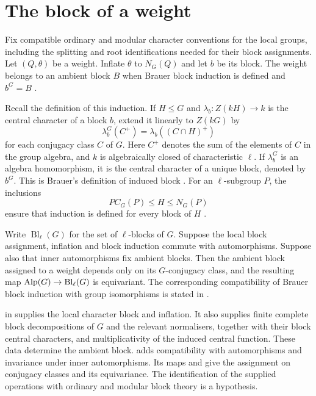 \section{The block of a weight}

Fix compatible ordinary and modular character conventions for the
local groups, including the splitting and root identifications needed
for their block assignments.
Let $(Q,\theta)$ be a weight. Inflate $\theta$ to $N_G(Q)$ and let
$b$ be its block. The weight belongs to an ambient block $B$ when
Brauer block induction is defined and $b^G=B$
\cite[p.~90]{Navarro1998}.

Recall the definition of this induction. If $H\leq G$ and
$\lambda_b:Z(kH)\to k$ is the central character of a block $b$,
extend it linearly to $Z(kG)$ by
\[
 \lambda_b^G(C^+)=\lambda_b((C\cap H)^+)
\]
for each conjugacy class $C$ of $G$. Here $C^+$ denotes the sum of
the elements of $C$ in the group algebra, and $k$ is algebraically
closed of characteristic $\ell$.
If $\lambda_b^G$ is an algebra homomorphism, it is the central
character of a unique block, denoted by $b^G$.
This is Brauer's definition of induced block
\cite[p.~87]{Navarro1998}.
For an $\ell$-subgroup $P$, the inclusions
\[
 P C_G(P)\leq H\leq N_G(P)
\]
ensure that induction is defined for every block of $H$
\cite[Theorem~4.14]{Navarro1998}.

Write $\operatorname{Bl}_\ell(G)$ for the set of $\ell$-blocks of $G$.
Suppose the local block assignment, inflation and block induction
commute with automorphisms. Suppose also that inner automorphisms fix
ambient blocks. Then the ambient block assigned to a weight depends
only on its $G$-conjugacy class, and the resulting map
$\operatorname{Alp}(G)\to\operatorname{Bl}_\ell(G)$ is equivariant.
The corresponding compatibility of Brauer block induction with group
isomorphisms is stated in \cite[Problem~4.4]{Navarro1998}.

\begin{implementation}
 in
 supplies the local
character block and inflation. It also supplies finite complete block
decompositions of $G$ and the relevant normalisers, together with their
block central characters, and multiplicativity of the induced central
function. These data determine the ambient block.
 adds
compatibility with automorphisms and invariance under inner
automorphisms. Its maps
 and
give the assignment on conjugacy classes and its equivariance.
The identification of the supplied operations with ordinary and
modular block theory is a hypothesis.
\end{implementation}

